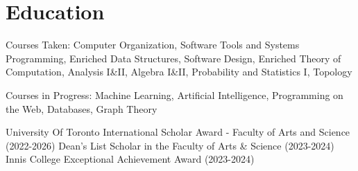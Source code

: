 \documentclass[letterpaper,10pt]{article}
\begin{document}

    \section{Education}

        \begin{resume_list}
            \item Courses Taken: Computer Organization, Software Tools and Systems Programming, Enriched Data Structures, Software Design, Enriched Theory of Computation, %
            Analysis I\&II, Algebra I\&II, Probability and Statistics I, Topology
            \item Courses in Progress: Machine Learning, Artificial Intelligence, Programming on the Web, Databases, Graph Theory
            \item University Of Toronto International Scholar Award - Faculty of Arts and Science (2022-2026)
            Dean’s List Scholar in the Faculty of Arts \& Science (2023-2024)
            Innis College Exceptional Achievement Award (2023-2024)
        \end{resume_list}


\end{document}

